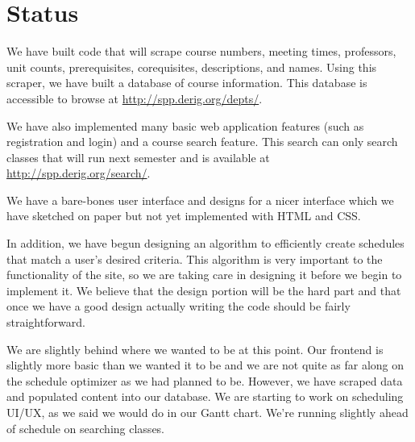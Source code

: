 \section{Status}
We have built code that will scrape course numbers, meeting times,
professors, unit counts, prerequisites, corequisites, descriptions, and names.
Using this scraper, we have built a database of course information. This database
is accessible to browse at \url{http://spp.derig.org/depts/}.

We have also implemented many basic web application features (such as
registration and login) and a course search feature. This search can only
search classes that will run next semester and is available at
\url{http://spp.derig.org/search/}.

We have a bare-bones user interface and designs for a nicer interface which we
have sketched on paper but not yet implemented with HTML and CSS.

In addition, we have begun designing an algorithm to efficiently create schedules
that match a user's desired criteria. This algorithm is very important to the
functionality of the site, so we are taking care in designing it before we begin
to implement it. We believe that the design portion will be the hard part and
that once we have a good design actually writing the code should be fairly
straightforward.

We are slightly behind where we wanted to be at this point. Our
frontend is slightly more basic than we wanted it to be and we
are not quite as far along on the schedule optimizer as we had planned to be.
However, we have scraped data and populated content into our database. We are
starting to work on scheduling UI/UX, as we said we would do in our Gantt chart.
We're running slightly ahead of schedule on searching classes.
